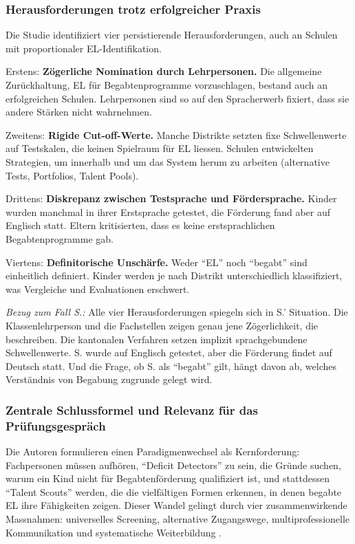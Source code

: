 \documentclass[ngerman, a4paper]{article}
\begin{document}
\subsubsection*{Herausforderungen trotz erfolgreicher Praxis}

Die Studie identifiziert vier persistierende Herausforderungen, auch an
Schulen mit proportionaler EL-Identifikation.

Erstens: \textbf{Zögerliche Nomination durch Lehrpersonen.} Die allgemeine
Zurückhaltung, EL für Begabtenprogramme vorzuschlagen, bestand auch an
erfolgreichen Schulen. Lehrpersonen sind so auf den Spracherwerb fixiert,
dass sie andere Stärken nicht wahrnehmen.

Zweitens: \textbf{Rigide Cut-off-Werte.} Manche Distrikte setzten fixe
Schwellenwerte auf Testskalen, die keinen Spielraum für EL liessen.
Schulen entwickelten Strategien, um innerhalb und um das System herum zu
arbeiten (alternative Tests, Portfolios, Talent Pools).

Drittens: \textbf{Diskrepanz zwischen Testsprache und Fördersprache.}
Kinder wurden manchmal in ihrer Erstsprache getestet, die Förderung fand
aber auf Englisch statt. Eltern kritisierten, dass es keine
erstsprachlichen Begabtenprogramme gab.

Viertens: \textbf{Definitorische Unschärfe.} Weder \enquote{EL} noch
\enquote{begabt} sind einheitlich definiert. Kinder werden je nach
Distrikt unterschiedlich klassifiziert, was Vergleiche und Evaluationen
erschwert.

\textit{Bezug zum Fall S.:} Alle vier Herausforderungen spiegeln sich in
S.' Situation. Die Klassenlehrperson und die Fachstellen zeigen genau jene
Zögerlichkeit, die \textcite{gubbins2020promising} beschreiben. Die
kantonalen Verfahren setzen implizit sprachgebundene Schwellenwerte. S.
wurde auf Englisch getestet, aber die Förderung findet auf Deutsch statt.
Und die Frage, ob S. als \enquote{begabt} gilt, hängt davon ab, welches
Verständnis von Begabung zugrunde gelegt wird.

\subsubsection*{Zentrale Schlussformel und Relevanz für das
  Prüfungsgespräch}

Die Autoren formulieren einen Paradigmenwechsel als Kernforderung:
Fachpersonen müssen aufhören, \enquote{Deficit Detectors} zu sein, die
Gründe suchen, warum ein Kind nicht für Begabtenförderung qualifiziert
ist, und stattdessen \enquote{Talent Scouts} werden, die die vielfältigen
Formen erkennen, in denen begabte EL ihre Fähigkeiten zeigen. Dieser
Wandel gelingt durch vier zusammenwirkende Massnahmen: universelles
Screening, alternative Zugangswege, multiprofessionelle Kommunikation und
systematische Weiterbildung \parencite{gubbins2020promising}.
\end{document}
